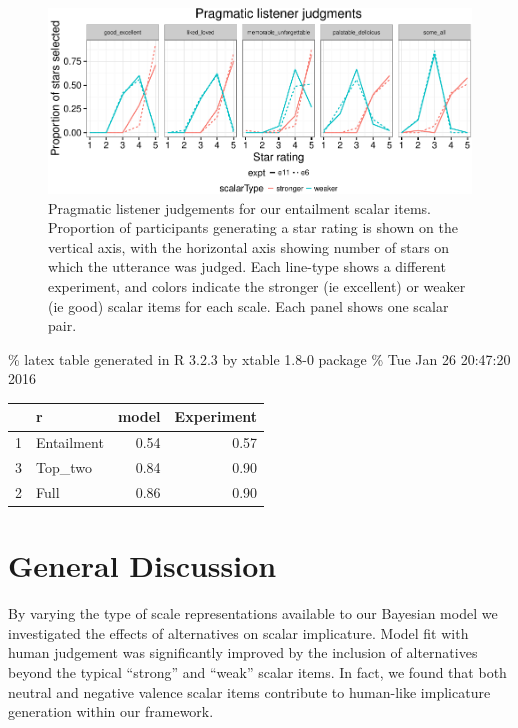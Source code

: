 \documentclass[10pt, letterpaper]{article}
\newenvironment{CodeChunk}{}{}
\begin{document}
\begin{CodeChunk}
\begin{figure}[t]

{\centering \includegraphics{figs/exp2Plots-1} 

}

\caption[Pragmatic listener judgements for our entailment scalar items]{Pragmatic listener judgements for our entailment scalar items. Proportion of participants generating a star rating is shown on the vertical axis, with the horizontal axis showing number of stars on which the utterance was judged. Each line-type shows a different experiment, and colors indicate the stronger (ie excellent) or weaker (ie good) scalar items for each scale. Each panel shows one scalar pair.}\label{fig:exp2Plots}
\end{figure}
\end{CodeChunk}

\% latex table generated in R 3.2.3 by xtable 1.8-0 package \% Tue Jan
26 20:47:20 2016

\begin{table}[ht]
\centering
\begin{tabular}{rlrr}
  \hline
 & r & model & Experiment \\ 
  \hline
1 & Entailment & 0.54 & 0.57 \\ 
  3 & Top\_two & 0.84 & 0.90 \\ 
  2 & Full & 0.86 & 0.90 \\ 
   \hline
\end{tabular}
\end{table}

\section{General Discussion}\label{general-discussion}

By varying the type of scale representations available to our Bayesian
model we investigated the effects of alternatives on scalar implicature.
Model fit with human judgement was significantly improved by the
inclusion of alternatives beyond the typical ``strong'' and ``weak''
scalar items. In fact, we found that both neutral and negative valence
scalar items contribute to human-like implicature generation within our
framework.
\end{document}
